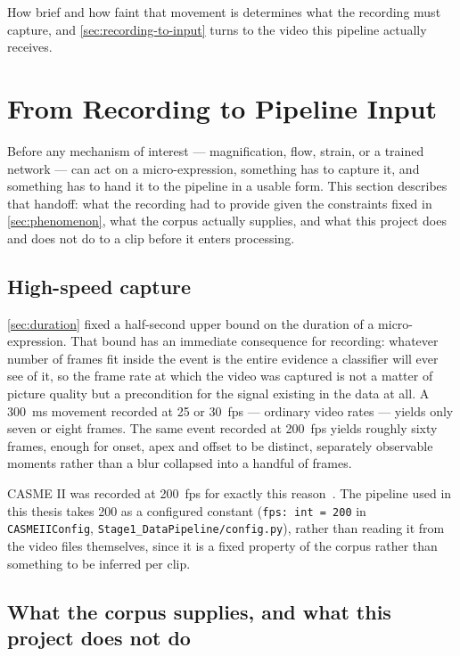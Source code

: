 How brief and how faint that movement is determines what the recording must capture, and \autoref{sec:recording-to-input} turns to the video this pipeline actually receives.


\section{From Recording to Pipeline Input}
\label{sec:recording-to-input}

Before any mechanism of interest --- magnification, flow, strain, or a trained network --- can act on a micro-expression, something has to capture it, and something has to hand it to the pipeline in a usable form. This section describes that handoff: what the recording had to provide given the constraints fixed in \autoref{sec:phenomenon}, what the corpus actually supplies, and what this project does and does not do to a clip before it enters processing.

\subsection{High-speed capture}
\label{sec:high-speed-capture}

\autoref{sec:duration} fixed a half-second upper bound on the duration of a micro-expression. That bound has an immediate consequence for recording: whatever number of frames fit inside the event is the entire evidence a classifier will ever see of it, so the frame rate at which the video was captured is not a matter of picture quality but a precondition for the signal existing in the data at all. A 300~ms movement recorded at 25 or 30~fps --- ordinary video rates --- yields only seven or eight frames. The same event recorded at 200~fps yields roughly sixty frames, enough for onset, apex and offset to be distinct, separately observable moments rather than a blur collapsed into a handful of frames.

CASME II was recorded at 200~fps for exactly this reason~\cite{yan2014}. The pipeline used in this thesis takes 200 as a configured constant (\texttt{fps: int = 200} in \texttt{CASMEIIConfig}, \texttt{Stage1\_DataPipeline/config.py}), rather than reading it from the video files themselves, since it is a fixed property of the corpus rather than something to be inferred per clip.

\subsection{What the corpus supplies, and what this project does not do}
\label{sec:corpus-supplies}

